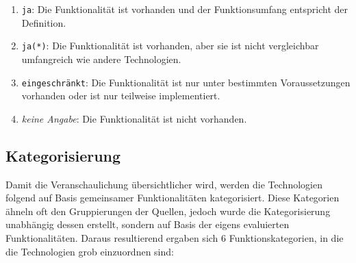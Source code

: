 \begin{enumerate}
	\item \texttt{ja}: Die Funktionalität ist vorhanden und der Funktionsumfang entspricht der Definition.
	\item \texttt{ja(*)}: Die Funktionalität ist vorhanden, aber sie ist nicht vergleichbar umfangreich wie andere Technologien.
	\item \texttt{eingeschränkt}: Die Funktionalität ist nur unter bestimmten Voraussetzungen vorhanden oder ist nur teilweise implementiert.
	\item \textit{keine Angabe}: Die Funktionalität ist nicht vorhanden.
\end{enumerate}

\pagebreak



\subsection{Kategorisierung}

Damit die Veranschaulichung übersichtlicher wird, werden die Technologien folgend auf Basis gemeinsamer Funktionalitäten kategorisiert. Diese Kategorien ähneln oft den Gruppierungen der Quellen, jedoch wurde die Kategorisierung unabhängig dessen erstellt, sondern auf Basis der eigens evaluierten Funktionalitäten. Daraus resultierend ergaben sich 6 Funktionskategorien, in die die Technologien grob einzuordnen sind:

